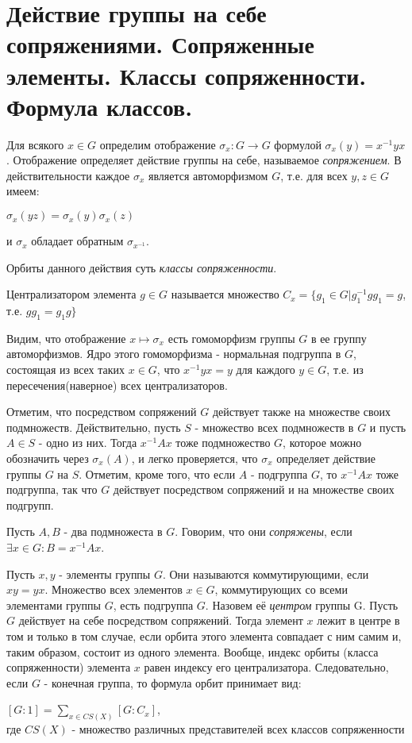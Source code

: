 \section{Действие группы на себе сопряжениями. Сопряженные элементы. Классы сопряженности. Формула классов.}

Для всякого $x \in G$ определим отображение $\sigma_x: G \rightarrow G$ формулой $\sigma_x(y) = x^{-1}yx$. Отображение
определяет действие группы на себе, называемое \emph{сопряжением}. В действительности каждое $\sigma_x$ является
автоморфизмом $G$, т.е. для всех $y, z \in G$ имеем:
\begin{center} $\sigma_x(yz) = \sigma_x(y)\sigma_x(z)$\\ \end{center}
и $\sigma_x$ обладает обратным $\sigma_{x^{-1}}$.

Орбиты данного действия суть \emph{классы сопряженности}.

\begin{defn}
Централизатором элемента $g \in G$ называется множество $C_x = \{g_1 \in G | g^{-1}_1gg_1 = g$, т.е. $gg_1 = g_1g\}$
\end{defn}


Видим, что отображение $x \mapsto \sigma_x$ есть гомоморфизм группы $G$ в ее группу автоморфизмов. Ядро этого гомоморфизма
- нормальная подгруппа в $G$, состоящая из всех таких $x \in G$, что $x^{-1}yx = y$ для каждого $y \in G$, т.е. из
пересечения(наверное) всех централизаторов. 

Отметим, что посредством сопряжений $G$ действует также на множестве своих подмножеств. Действительно, пусть $S$ - множество
всех подмножеств в $G$ и пусть $A \in S$ - одно из них. Тогда $x^{-1}Ax$ тоже подмножество $G$, которое можно обозначить
через $\sigma_x(A)$, и легко проверяется, что $\sigma_x$ определяет действие группы $G$ на $S$. Отметим, кроме того, что
если $A$ - подгруппа $G$, то $x^{-1}Ax$ тоже подгруппа, так что $G$ действует посредством сопряжений и на множестве своих
подгрупп.

\begin{defn}
Пусть $A, B$ - два подмножеста в $G$. Говорим, что они \emph{сопряжены}, если $\exists x \in G: B = x^{-1}Ax$.
\end{defn}

Пусть $x, y$ - элементы группы $G$. Они называются коммутирующими, если $xy = yx$. Множество всех элементов $x \in G$,
коммутирующих со всеми элементами группы $G$, есть подгруппа $G$. Назовем её \emph{центром} группы G. Пусть $G$ действует
на себе посредством сопряжений. Тогда элемент $x$ лежит в центре в том и только в том случае, если орбита этого элемента
совпадает с ним самим и, таким образом, состоит из одного элемента. Вообще, индекс орбиты (класса сопряженности) элемента
$x$ равен индексу его централизатора. Следовательно, если $G$ - конечная группа, то формула орбит принимает вид:
\begin{center} $[G:1] = {\underset{x \in CS(X)}{\sum}}[G : C_x]$,\\
где $CS(X)$ - множество различных представителей всех классов сопряженности \end{center}
